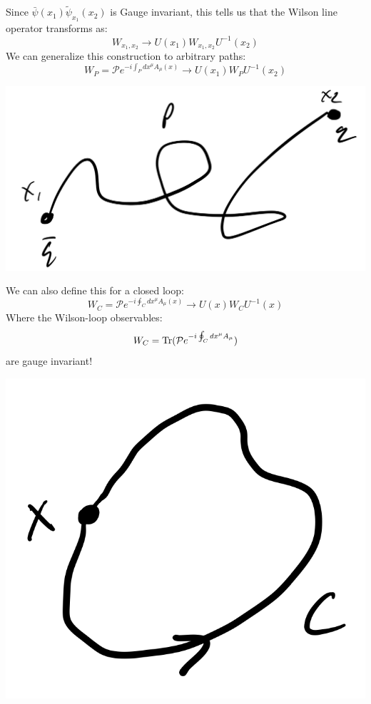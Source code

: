 Since $ \bar{\psi}(x_1)\tilde{\psi}_{x_1}(x_2)$ is Gauge invariant, this tells us that the Wilson line operator transforms as:
\begin{equation}
    W_{x_1, x_2} \to U(x_1)W_{x_1, x_2}U^{-1}(x_2)
\end{equation}
We can generalize this construction to arbitrary paths:
\begin{equation}
    W_P = \mathcal{P}e^{-i\int_P dx^\mu A_\mu(x)} \to U(x_1)W_P U^{-1}(x_2)
\end{equation}

\begin{center}
    \includegraphics[scale=0.35]{Lectures/Images/lec17-wilsonlinepath.png}
\end{center}

We can also define this for a closed loop:
\begin{equation}
    W_C = \mathcal{P}e^{-i\oint_C dx^\mu A_\mu(x)} \to U(x)W_C U^{-1}(x)
\end{equation}
Where the Wilson-loop observables:
\begin{equation}
    W_C = \mathrm{Tr}(\mathcal{P}e^{-i\oint_C dx^\mu A_\mu})
\end{equation}
are gauge invariant!

\begin{center}
    \includegraphics[scale=0.35]{Lectures/Images/lec17-wilsonloop.png}
\end{center}

